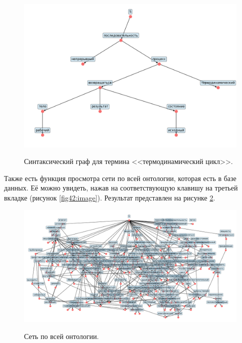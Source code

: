 \newpage
\begin{figure}[t]
	\begin{center}
		{\includegraphics[scale = 0.6]{img/examples/tree.png}}
		\caption{Синтаксический граф для термина <<термодинамический цикл>>.}
		\label{fig47:image}
	\end{center}
\end{figure}
Также есть функция просмотра сети по всей онтологии, которая есть в базе данных. Её можно увидеть, нажав на соответствующую клавишу на третьей вкладке (рисунок \ref{fig42:image}). Результат представлен на рисунке \ref{fig48:image}.

\begin{figure}[h!]
	\begin{center}
		{\includegraphics[scale = 0.52, angle=90]{img/examples/net.png}}
		\caption{Сеть по всей онтологии.}
		\label{fig48:image}
	\end{center}
\end{figure}

\newpage

